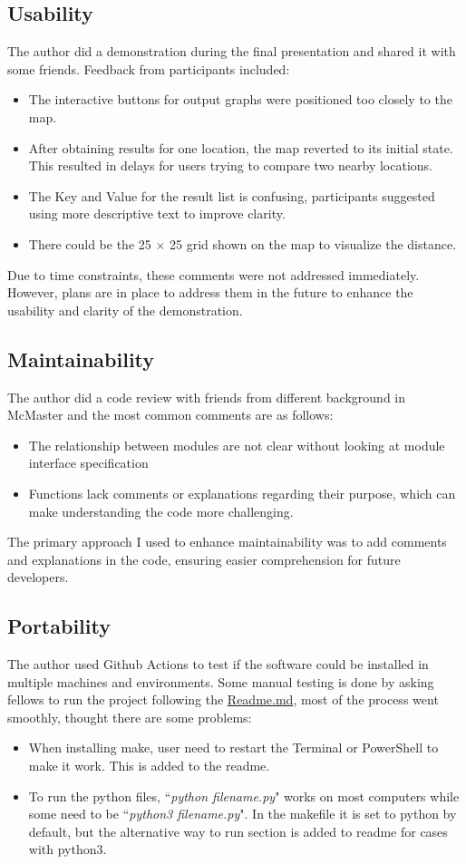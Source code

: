 \documentclass[12pt, titlepage]{article}
\begin{document}
\subsection{Usability}
The author did a demonstration during the final presentation and shared it with some friends. Feedback from participants included:
\begin{itemize}
\item The interactive buttons for output graphs were positioned too closely to the map.
\item After obtaining results for one location, the map reverted to its initial state. This resulted in delays for users trying to compare two nearby locations.
\item The Key and Value for the result list is confusing, participants suggested using more descriptive text to improve clarity.
\item There could be the 25 $\times$ 25 grid shown on the map to visualize the distance.
\end{itemize}
Due to time constraints, these comments were not addressed immediately. However, plans are in place to address them in the future to enhance the usability and clarity of the demonstration.

\subsection{Maintainability}
The author did a code review with friends from different background in McMaster and the most common comments are as follows:
\begin{itemize}
\item The relationship between modules are not clear without looking at module interface specification
\item Functions lack comments or explanations regarding their purpose, which can make understanding the code more challenging.
\end{itemize}
The primary approach I used to enhance maintainability was to add comments and explanations in the code, ensuring easier comprehension for future developers.


\subsection{Portability}
The author used Github Actions to test if the software could be installed in multiple machines and environments. Some manual testing is done by asking fellows to run the project following the \href{https://github.com/CynthiaLiu0805/BridgeCorrosion/blob/main/README.md}{Readme.md}, most of the process went smoothly, thought there are some problems:
\begin{itemize}
\item When installing make, user need to restart the Terminal or PowerShell to make it work. This is added to the readme.
\item To run the python files, ``\textit{python filename.py}" works on most computers while some need to be ``\textit{python3 filename.py}". In the makefile it is set to python by default, but the alternative way to run section is added to readme for cases with python3.
\end{itemize}
\end{document}
